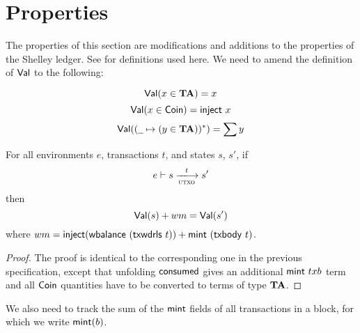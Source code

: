 \newcommand{\Val}{\fun{Val}}
\newcommand{\POV}[2]{\ensuremath{\mathsf{PresOfVal}(#1, \mathsf{#2})}}

\section{Properties}
\label{sec:properties}

The properties of this section are modifications and additions to the properties of the Shelley ledger. See \cite{shelley_spec} for definitions used here. We need to amend the definition of $\Val$ to the following:

\begin{equation*}
    \Val(x \in \ValMonoid) = x
\end{equation*}
\begin{equation*}
    \Val(x \in \Coin) = \fun{inject}~x
\end{equation*}
\begin{equation*}
    \Val((\wcard\mapsto (y \in \ValMonoid))^{*}) = \sum y
\end{equation*}

\begin{lemma}
  \label{lemma:utxo-pres-of-value}
  For all environments $e$, transactions $t$, and states $s$, $s'$, if
  \begin{equation*}
    e\vdash s\trans{utxo}{t}s'
  \end{equation*}
  then
  \begin{equation*}
    \Val(s) + wm = \Val(s')
  \end{equation*}
  where $wm = \mathsf{inject} (\mathsf{wbalance}~(\mathsf{txwdrls}~{t})) + \mathsf{mint}~(\mathsf{txbody}~{t})$.
\end{lemma}
\begin{proof}
  The proof is identical to the corresponding one in the previous
  specification, except that unfolding $\mathsf{consumed}$ gives an
  additional $\mathsf{mint}~{txb}$ term and all $\mathsf{Coin}$ quantities have
  to be converted to terms of type $\mathbf{TA}$.
\end{proof}

We also need to track the sum of the $\mathsf{mint}$ fields of all
transactions in a block, for which we write $\mathsf{mint}(b)$.

